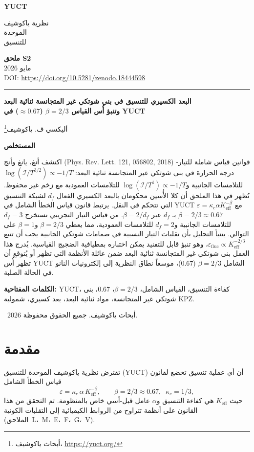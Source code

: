 \documentclass[11pt,a4paper]{article}
\newcommand{\Keff}{K_{\mathrm{eff}}}
\newcommand{\makeheader}{%
	\noindent
	\begin{minipage}{0.17\textwidth}
		\raggedright
		{\sffamily\bfseries\color{skyblue}\fontsize{46}{46}\selectfont YUCT}%
	\end{minipage}%
	\hspace{30pt}
	\begin{minipage}{0.32\textwidth}
		\raggedright
		{\sffamily\fontsize{11}{13}\selectfont نظرية ياكوشيف\\ الموحدة\\ للتنسيق}%
	\end{minipage}%
	\hfill
	\begin{minipage}{0.38\textwidth}
		\raggedleft
		{\sffamily\bfseries ملحق S2}\\
		{\sffamily مايو 2026}\\
		{\sffamily\footnotesize DOI: \url{https://doi.org/10.5281/zenodo.18444598}}%
	\end{minipage}
	\par\vspace{5pt}
	\noindent\textcolor{gold}{\rule{\textwidth}{1.6pt}}
	\par\vspace{0pt}
}
\begin{document}
	\thispagestyle{firstpage}
	\makeheader
	
	\vspace{0cm}
	{\LARGE\bfseries البعد الكسيري للتنسيق في بنى شوتكي غير المتجانسة ثنائية البعد \\ وتنبؤ أُس القياس \(\beta = 2/3\) (\(\approx 0.67\)) في YUCT \par}
	\vspace{0.2cm}
	
	{\large أليكسي ف. ياكوشيف\footnote{أبحاث ياكوشيف، \url{https://yuct.org/}}} \\
	\vspace{0.0cm}
	
	{\color{darkblue}\textbf{\LARGE المستخلص}} \par
	{\large
		\noindent
		اكتشف أنغ، يانغ وأنج (Phys. Rev. Lett. 121, 056802, 2018) قوانين قياس شاملة للتيار-درجة الحرارة في بنى شوتكي غير المتجانسة ثنائية البعد: \(\log(\mathcal{I}/T^{3/2}) \propto -1/T\) للتلامسات الجانبية و\(\log(\mathcal{I}/T^{1}) \propto -1/T\) للتلامسات العمودية مع زخم غير محفوظ. نُظهر في هذا الملحق أن كلا الأُسين محكومان بالبعد الكسيري الفعال \(d_f\) لشبكة التنسيق التي تتحكم في النقل. يرتبط قانون قياس الخطأ الشامل في YUCT \(\varepsilon = \kappa_c\alpha K_{\mathrm{eff}}^{-\beta}\) مع \(\beta = 2/3 \approx 0.67\) بـ \(d_f\) عبر \(\beta = 2/d_f\). من قياس التيار التجريبي نستخرج \(d_f = 3\) للتلامسات الجانبية و\(d_f = 2\) للتلامسات العمودية، مما يعطي \(\beta = 2/3\) و\(\beta = 1\) على التوالي. يتنبأ التحليل بأن تقلبات التيار النسبية في صمامات شوتكي الجانبية يجب أن تتبع \(\varepsilon_{\mathrm{fluc}} \propto K_{\mathrm{eff}}^{-2/3}\)، وهو تنبؤ قابل للتفنيد يمكن اختباره بمطيافية الضجيج القياسية. يُدرج هذا العمل بنى شوتكي غير المتجانسة ثنائية البعد ضمن عائلة الأنظمة التي تظهر أو يُتوقع أن تظهر أُس YUCT الشامل \(\beta = 2/3\) (\(0.67\))، موسعاً نطاق النظرية إلى إلكترونيات النانو في الحالة الصلبة.
	}
	
	\vspace{0.1cm}
	\noindent
	{\color{darkblue}\textbf{الكلمات المفتاحية:}} YUCT، كفاءة التنسيق، القياس الشامل، \(\beta = 2/3\)، 0.67، بنى شوتكي غير المتجانسة، مواد ثنائية البعد، بعد كسيري، شمولية KPZ.
	
	\vspace{0.5cm}
	\noindent
	\textcopyright\ 2026 أبحاث ياكوشيف. جميع الحقوق محفوظة.
	
	\tableofcontents
	\newpage
	
	\section{مقدمة}
	تفترض نظرية ياكوشيف الموحدة للتنسيق (YUCT) أن أي عملية تنسيق تخضع لقانون قياس الخطأ الشامل
	\begin{equation}
		\varepsilon = \kappa_c \, \alpha \, \Keff^{-\beta},
		\qquad \beta = 2/3 \approx 0.67,\;\; \kappa_c = 1/3,
		\label{eq:yuct-law}
	\end{equation}
	حيث \(\Keff\) هي كفاءة التنسيق و\(\alpha\) عامل قبل-أسي خاص بالمنظومة. تم التحقق من هذا القانون على أنظمة تتراوح من الروابط الكيميائية إلى التقلبات الكونية (الملاحق~L،~M،~E،~F،~G،~V).
	
\end{document}
